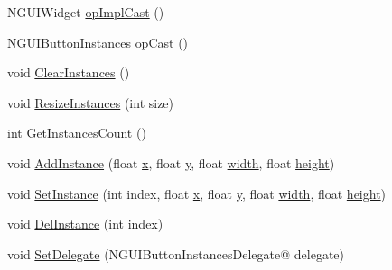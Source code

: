\begin{DoxyCompactItemize}
\item 
N\+G\+U\+I\+Widget \hyperlink{class_n_g_u_i_button_instances_aa516ba0f40b6f53c222bffbb96728658}{op\+Impl\+Cast} ()
\item 
\hyperlink{class_n_g_u_i_button_instances}{N\+G\+U\+I\+Button\+Instances} \hyperlink{class_n_g_u_i_button_instances_a4fb1c8a70df1262214cb049f7f874347}{op\+Cast} ()
\item 
void \hyperlink{class_n_g_u_i_button_instances_adbdc40d73856bcabe40e1b2b0bde8070}{Clear\+Instances} ()
\item 
void \hyperlink{class_n_g_u_i_button_instances_a97f3b0512ba13b8d68544fa0a9985d0f}{Resize\+Instances} (int size)
\item 
int \hyperlink{class_n_g_u_i_button_instances_a99b5e04d788190058738d388133c1d63}{Get\+Instances\+Count} ()
\item 
void \hyperlink{class_n_g_u_i_button_instances_a3dfa4938220575aac4a954de6803543e}{Add\+Instance} (float \hyperlink{class_n_g_u_i_button_instances_aeb27d0671d0764ec6cc251310acee798}{x}, float \hyperlink{class_n_g_u_i_button_instances_a4fe7ac36eb2d4dfa9b2510a68a609e4c}{y}, float \hyperlink{class_n_g_u_i_button_instances_a30717e4188a9908c617538e182b1c6d5}{width}, float \hyperlink{class_n_g_u_i_button_instances_a40a78feaa15d4cbea0c92ce238502635}{height})
\item 
void \hyperlink{class_n_g_u_i_button_instances_a6d1bd3fa83a29998daf10450c85d3f1b}{Set\+Instance} (int index, float \hyperlink{class_n_g_u_i_button_instances_aeb27d0671d0764ec6cc251310acee798}{x}, float \hyperlink{class_n_g_u_i_button_instances_a4fe7ac36eb2d4dfa9b2510a68a609e4c}{y}, float \hyperlink{class_n_g_u_i_button_instances_a30717e4188a9908c617538e182b1c6d5}{width}, float \hyperlink{class_n_g_u_i_button_instances_a40a78feaa15d4cbea0c92ce238502635}{height})
\item 
void \hyperlink{class_n_g_u_i_button_instances_a8984fb9bd5727addc84361a33f16cb2c}{Del\+Instance} (int index)
\item 
void \hyperlink{class_n_g_u_i_button_instances_ab2b614952387fb9d620f9e4585abc979}{Set\+Delegate} (N\+G\+U\+I\+Button\+Instances\+Delegate@ delegate)
\end{DoxyCompactItemize}
